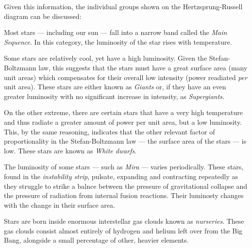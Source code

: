 Given this information, the individual groups shown on the Hertzsprung-Russell diagram can be discussed:

\begin{itemize}


	Most stars --- including our sun --- fall into a narrow band called the \emph{Main Sequence}. In this category, the luminosity of the star rises with temperature.


	Some stars are relatively cool, yet have a high luminosity. Given the Stefan-Boltzmann law, this suggests that the stars must have a great surface area (many unit areas) which compensates for their overall low intensity (power readiated \emph{per} unit area). These stars are either known as \emph{Giants} or, if they have an even greater luminosity with no significant increase in intensity, as \emph{Supergiants}.


	On the other extreme, there are certain stars that have a very high temperature and thus radiate a greater amount of power per unit area, but a low luminosity. This, by the same reasoning, indicates that the other relevant factor of proportionality in the Stefan-Boltzmann law --- the surface area of the stars --- is low. These stars are known as \emph{White dwarfs}.


	The luminosity of some stars --- such as \emph{Mira} --- varies periodically. These stars, found in the \emph{instability strip}, pulsate, expanding and contracting repeatedly as they struggle to strike a balnce between the pressure of gravitational collapse and the pressure of radiation from internal fusion reactions. Their luminosty changes with the change in their surface area.

\end{itemize}




Stars are born inside enormous interstellar gas clouds known as \emph{nurseries}. These gas clouds consist almost entirely of hydrogen and helium left over from the Big Bang, alongside a small percentage of other, heavier elements.



